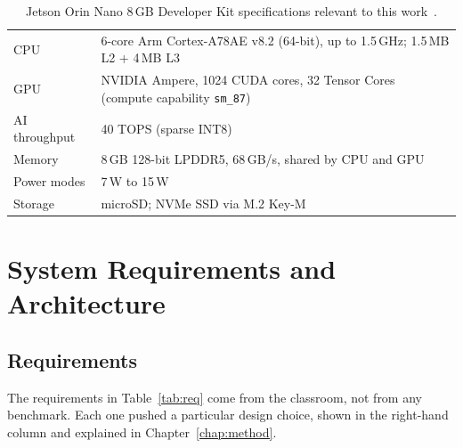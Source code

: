 \documentclass[11pt,a4paper,oneside]{report}
\theoremstyle{definition}
\begin{document}
\begin{table}[ht]
\centering\small
\caption{Jetson Orin Nano 8\,GB Developer Kit specifications relevant to this work~\cite{nvidia2023orinnano}.}
\label{tab:jetson}
\begin{tabularx}{0.9\textwidth}{@{}lX@{}}
\toprule
CPU & 6-core Arm Cortex-A78AE v8.2 (64-bit), up to 1.5\,GHz; 1.5\,MB L2 + 4\,MB L3 \\
GPU & NVIDIA Ampere, 1024 CUDA cores, 32 Tensor Cores (compute capability \texttt{sm\_87}) \\
AI throughput & 40 TOPS (sparse INT8) \\
Memory & 8\,GB 128-bit LPDDR5, 68\,GB/s, shared by CPU and GPU \\
Power modes & 7\,W to 15\,W \\
Storage & microSD; NVMe SSD via M.2 Key-M \\
\bottomrule
\end{tabularx}
\end{table}

\chapter{System Requirements and Architecture}
\label{chap:arch}

\section{Requirements}
The requirements in Table~\ref{tab:req} come from the classroom, not from any benchmark. Each one pushed a particular design choice, shown in the right-hand column and explained in Chapter~\ref{chap:method}.
\end{document}
